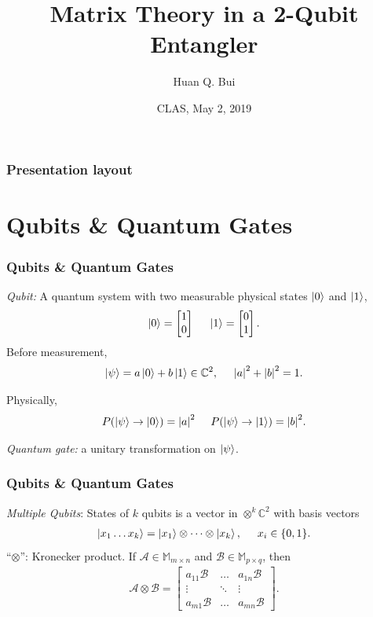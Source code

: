 \documentclass{beamer}
\title{Matrix Theory in a 2-Qubit Entangler}
\author[Huan Q. Bui] %
{Huan Q. Bui}
\institute[Colby College] %
{
	
	Matrix Analysis
	\and
	Professor Leo Livshits
}
\date{CLAS, May 2, 2019}
\theoremstyle{definition}
\newcommand{\A}{\mathcal{A}}
\newcommand{\B}{\mathcal{B}}
\begin{document}
 
\frame{\titlepage}
 
\begin{frame}
\frametitle{Presentation layout}
\tableofcontents
\end{frame}

\section{Qubits \& Quantum Gates}

\begin{frame}
\frametitle{Qubits \& Quantum Gates}
\textit{Qubit:} A quantum system with two measurable physical states $\left\vert{0}\right\rangle$ and $\left\vert{1}\right\rangle$,
\begin{align*}
\left\vert{0}\right\rangle = \begin{bmatrix}
1\\0
\end{bmatrix}\hspace{0.5cm} \left\vert{1}\right\rangle = \begin{bmatrix}
0\\1
\end{bmatrix}.
\end{align*}
Before measurement,
\begin{align*}
\left\vert{\psi}\right\rangle = a\left\vert{0}\right\rangle + b\left\vert{1}\right\rangle \in \mathbb{C}^2,\hspace{0.5cm} \abs{a}^2 + \abs{b}^2 = 1.
\end{align*}

Physically,
\begin{align*}
P(\left\vert{\psi}\right\rangle \to \left\vert{0}\right\rangle) = \abs{a}^2\hspace{0.5cm}
P(\left\vert{\psi}\right\rangle \to \left\vert{1}\right\rangle) = \abs{b}^2.
\end{align*}

\textit{Quantum gate:} a unitary transformation on $\left\vert{\psi}\right\rangle$. 
\end{frame}

\begin{frame}
\frametitle{Qubits \& Quantum Gates}

\textit{Multiple Qubits}: States of $k$ qubits is a vector in $\otimes^k\mathbb{C}^2$ with basis vectors
\begin{align*}
\left\vert{x_1\dots x_k}\right\rangle = \left\vert{x_1}\right\rangle\otimes \dots \otimes \left\vert{x_k}\right\rangle, \hspace{0.5cm} x_i \in \{0,1\}.
\end{align*}
``$\otimes$'': Kronecker product. If $\A \in \mathbb{M}_{m\times n}$ and $\B \in \mathbb{M}_{p\times q}$, then
\begin{align*}
\A \otimes \B = \begin{bmatrix}
a_{11}\B & \dots & a_{1n}\B\\
\vdots & \ddots & \vdots\\
a_{m1}\B & \dots & a_{mn}\B
\end{bmatrix}.
\end{align*}
\end{frame}
\end{document}
